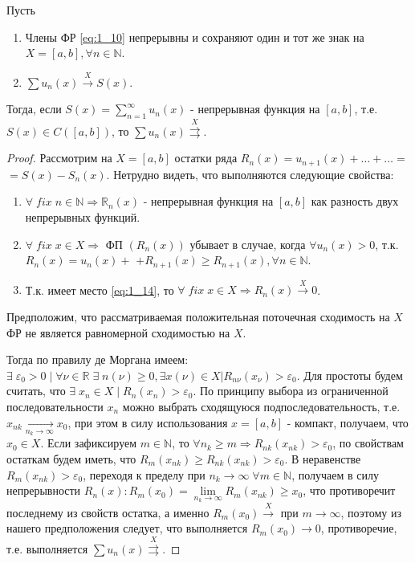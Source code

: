 \begin{theorem}
	Пусть
	\begin{enumerate}
		\item Члены ФР \eqref{eq:1_10} непрерывны и сохраняют один и тот же знак на $X = [a, b], \forall n \in \mathbb{N}$.
		\item $\sum u_n(x) \overset{X}{\to} S(x)$.
	\end{enumerate}
	Тогда, если $S(x) = \sum\limits_{n=1}^{\infty} u_n (x)$ - непрерывная функция на $[a, b]$, т.е. $S(x) \in C([a, b])$, то $\sum u_n(x) \overset{X}{\rightrightarrows}$.
\end{theorem}
\begin{proof}
	Рассмотрим на $X = [a,b]$ остатки ряда $R_n(x) = u_{n+1}(x) + \ldots + \ldots =$ $= S(x) - S_n(x)$.	Нетрудно видеть, что выполняются следующие свойства:
	\begin{enumerate}
		\item $\forall \; fix \; n \in \mathbb{N} \Rightarrow \mathbb{R}_n (x)$ - непрерывная функция на $[a,b]$ как разность двух непрерывных функций.
		\item $\forall \; fix \; x \in X \Rightarrow$ ФП $(R_n(x))$ убывает в случае, когда $\forall u_n (x) > 0$, т.к. $R_n(x) = u_n(x) +$ $+ R_{n+1}(x) \geqslant R_{n+1}(x), \forall n \in \mathbb{N}$.
		\item Т.к. имеет место \eqref{eq:1_14}, то $\forall \; fix \; x \in X \Rightarrow R_n(x) \overset{X}{\to} 0$.
	\end{enumerate}
	Предположим, что рассматриваемая положительная поточечная сходимость на $X$ ФР не является равномерной сходимостью на $X$.

	Тогда по правилу де Моргана имеем: $\exists \; \varepsilon_0 > 0 \; | \; \forall \nu \in \mathbb{R} \; \exists \; n (\nu) \geqslant 0, \exists x (\nu) \in X | R_{n \nu} (x_\nu) > \varepsilon_0$. Для простоты будем считать, что $\exists \; x_n \in X \; | \; R_n (x_n) > \varepsilon_0$. По принципу выбора из ограниченной последовательности $x_n$ можно выбрать сходящуюся подпоследовательность, т.е. $x_{nk} \underset{n_k \to \infty}{\longrightarrow} x_0$, при этом в силу использования $x = [a,b]$ - компакт, получаем, что $x_0 \in X$. Если зафиксируем $m \in \mathbb{N}$, то $\forall n_k \geqslant m \Rightarrow R_{nk} 	(x_{nk}) > \varepsilon_0$, по свойствам остаткам будем иметь, что $R_{m} (x_{nk}) \geqslant R_{nk} (x_{nk}) > \varepsilon_0$. В неравенстве $R_m (x_{nk}) > \varepsilon_0$, переходя к пределу при $n_k \to \infty \; \forall m \in \mathbb{N}$, получаем в силу непрерывности $R_n(x): R_m (x_0) = \lim\limits_{n_k \to \infty} R_m(x_{nk}) \geqslant x_0$, что противоречит последнему из свойств остатка, а именно $R_m(x_0) \overset{X}{\longrightarrow}$ при $m \to \infty$, поэтому из нашего предположения следует, что выполняется $R_m(x_0) \to 0$, противоречие, т.е. выполняется $\sum u_n(x) \overset{X}{\rightrightarrows}$.
\end{proof}
